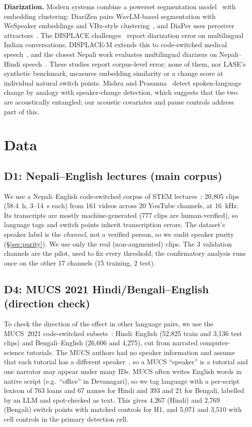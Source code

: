 \documentclass[conference]{IEEEtran}
\begin{document}
\textbf{Diarization.}
Modern systems combine a powerset segmentation model~\cite{plaquet2023} with embedding
clustering: DiariZen pairs WavLM-based segmentation with WeSpeaker embeddings and VBx-style
clustering~\cite{han2025diarizen,landini2022vbx}, and DiaPer uses perceiver
attractors~\cite{landini2024diaper}. The DISPLACE
challenges~\cite{baghel2023displace,displace2024} report diarization error on multilingual
Indian conversations, DISPLACE-M extends this to code-switched medical
speech~\cite{displacem2026,barahona2026}, and the closest Nepali work evaluates multilingual
diarizers on Nepali--Hindi speech~\cite{neupane2026}. These studies report corpus-level
error; none of them, nor LASE's synthetic benchmark, measures embedding similarity or a
change score at individual natural switch points. Mishra and Prasanna~\cite{mishra2023}
detect spoken-language change by analogy with speaker-change detection, which suggests that
the two are acoustically entangled; our acoustic covariates and pause controls address part
of this.

\section{Data}
\label{sec:data}
\subsection{D1: Nepali--English lectures (main corpus)}
We use a Nepali--English code-switched corpus of STEM lectures~\cite{dahal2026csasr}:
20{,}805 clips (58.4~h, 3--14~s each) from 161 videos across 20 YouTube channels, at
16~kHz. Its transcripts are mostly machine-generated (777 clips are human-verified), so
language tags and switch points inherit transcription errors. The dataset's speaker label is
the \emph{channel}, not a verified person, so we audit speaker purity (\S\ref{sec:purity}).
We use only the real (non-augmented) clips. The 3 validation channels are the pilot, used to
fix every threshold; the confirmatory analysis runs once on the other 17 channels (15
training, 2 test).

\subsection{D4: MUCS 2021 Hindi/Bengali--English (direction check)}
To check the direction of the effect in other language pairs, we use the MUCS~2021
code-switched subsets~\cite{diwan2021mucs}: Hindi--English (52{,}825 train and 3{,}136 test
clips) and Bengali--English (26{,}606 and 4{,}275), cut from narrated computer-science
tutorials. The MUCS authors had no speaker information and assume that each tutorial has a
different speaker~\cite{diwan2021mucs}, so a MUCS ``speaker'' is a tutorial and one narrator
may appear under many IDs. MUCS often writes English words in native script (e.g.\
``office'' in Devanagari), so we tag language with a per-script lexicon of 763 loans and 67
names for Hindi and 393 and 21 for Bengali, labelled by an LLM and spot-checked as text.
This gives 4{,}267 (Hindi) and 2{,}769 (Bengali) switch points with matched controls for H1,
and 5{,}071 and 3{,}510 with cell controls in the primary detection cell.
\end{document}
